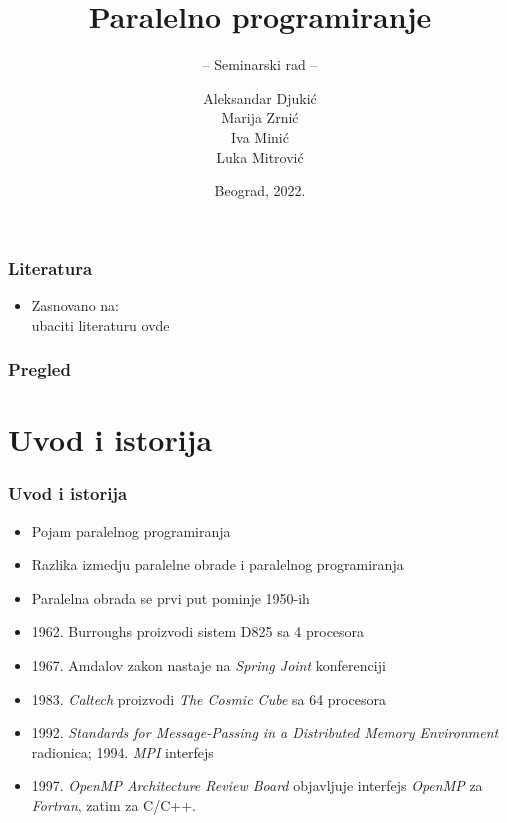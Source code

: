 \documentclass{beamer}
\title{Paralelno programiranje}
\subtitle{-- Seminarski rad --}
\author{Aleksandar Djukić \\Marija Zrnić \\Iva Minić \\Luka Mitrović}
\institute{Matematički fakultet\\Univerzitet u Beogradu}
\date{
	\footnotesize{Beograd, 2022.}	
}
\begin{document}
	\begin{frame}
		\thispagestyle{empty}
		\titlepage
	\end{frame}
	
	\addtocounter{framenumber}{-1}
	
	\begin{frame}[fragile]\frametitle{Literatura}
		\begin{itemize}
			\item Zasnovano na:\\
			ubaciti literaturu ovde
		\end{itemize}
	\end{frame}
	
	\begin{frame}
		\frametitle{Pregled}
		\tableofcontents[hidesubsections] 
	\end{frame}
	
	\section{Uvod i istorija}
	
	\begin{frame}[fragile]\frametitle{Uvod i istorija}
		\begin{itemize}	
			\item Pojam paralelnog programiranja
			\item Razlika izmedju paralelne obrade i paralelnog programiranja
			\bigskip
			\item Paralelna obrada se prvi put pominje 1950-ih
			\item 1962. Burroughs proizvodi sistem D825 sa 4 procesora
			\item 1967. Amdalov zakon nastaje na \emph{Spring Joint} konferenciji
			\item 1983. \emph{Caltech} proizvodi \emph{The Cosmic Cube} sa 64 procesora
			\bigskip
			\item 1992. \emph{Standards for Message-Passing in a Distributed Memory Environment} radionica; 1994. \emph{MPI} interfejs
			\item 1997. \emph{OpenMP Architecture Review Board} objavljuje interfejs \emph{OpenMP} za \emph{Fortran}, zatim za C/C++.
		\end{itemize}
	\end{frame}
	
	
\end{document}
